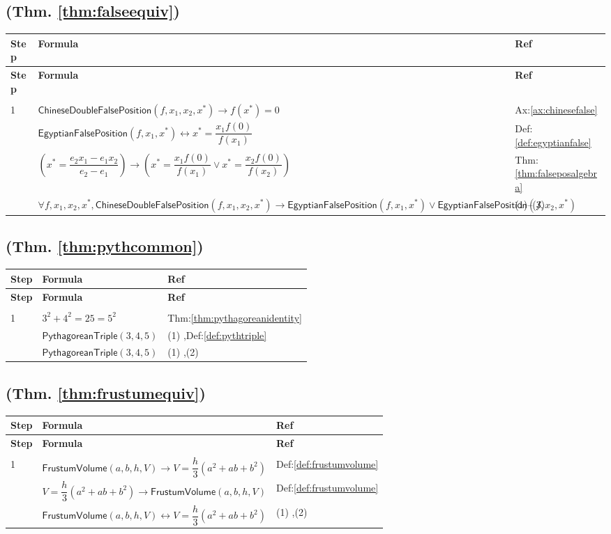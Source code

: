 \documentclass[12pt]{amsart}
\newcommand{\br}{,\allowbreak}
\newenvironment{prooftable}{%
	\renewcommand{\arraystretch}{1.2}%
	\setlength{\tabcolsep}{4pt}%
	\setlength{\arrayrulewidth}{0.05pt}
	\tiny
	\sloppy
	\begin{longtable}{
			|>{\centering\arraybackslash}m{0.7cm}|
			>{\raggedright\centering\arraybackslash}m{0.70\textwidth}|
			>{\centering\arraybackslash}m{3.5cm}|  %
		}%
		\hline
		\textbf{Step} & \centering\textbf{Formula} & \textbf{Ref} \\
		\hline
		\endfirsthead
		\hline
		\textbf{Step} & \centering\textbf{Formula} & \textbf{Ref} \\
		\hline
		\endhead
		\hline
		\multicolumn{3}{r}{\textit{Continued on next page}} \\
		\endfoot
		\hline
		\endlastfoot
	}{%
	\end{longtable}%
}
\begin{document}
\subsection{(Thm. \ref{thm:falseequiv})}
\begin{prooftable}
	1 & $\textsf{ChineseDoubleFalsePosition}(f \br x_1 \br x_2 \br x^*) \to f(x^*)=0$ & Ax:\ref{ax:chinesefalse} \\[3pt] \hline
	2 & $\textsf{EgyptianFalsePosition}(f \br x_1 \br x^*) \leftrightarrow x^* = \dfrac{x_1 f(0)}{f(x_1)}$ & Def:\ref{def:egyptianfalse} \\[3pt] \hline
	3 & $\left( x^* = \dfrac{e_2 x_1 - e_1 x_2}{e_2 - e_1} \right) \to \left( x^* = \dfrac{x_1 f(0)}{f(x_1)} \vee x^* = \dfrac{x_2 f(0)}{f(x_2)} \right)$ & Thm:\ref{thm:falseposalgebra} \\[3pt] \hdashline
	& $\forall f \br x_1 \br x_2 \br x^* \br  \textsf{ChineseDoubleFalsePosition}(f \br x_1 \br x_2 \br x^*) \to \textsf{EgyptianFalsePosition}(f \br x_1 \br x^*) \vee \textsf{EgyptianFalsePosition}(f \br x_2 \br x^*)$ & (1)--(3)
\end{prooftable}
\subsection{(Thm. \ref{thm:pythcommon})}
\begin{prooftable}
	1 & $3^2+4^2 = 25 = 5^2$ & Thm:\ref{thm:pythagoreanidentity} \\[3pt] \hline
	2 & $\textsf{PythagoreanTriple}(3 \br 4 \br 5)$ & (1) \br  Def:\ref{def:pythtriple} \\[3pt] \hdashline
	& $\textsf{PythagoreanTriple}(3 \br 4 \br 5)$ & (1) \br (2)
\end{prooftable}

\subsection{(Thm. \ref{thm:frustumequiv})}
\begin{prooftable}
	1 & $\textsf{FrustumVolume}(a \br b \br h \br V) \to V = \dfrac{h}{3}(a^2+ab+b^2)$ & Def:\ref{def:frustumvolume} \\[3pt] \hline
	2 & $V = \dfrac{h}{3}(a^2+ab+b^2) \to \textsf{FrustumVolume}(a \br b \br h \br V)$ & Def:\ref{def:frustumvolume} \\[3pt] \hdashline
	& $\textsf{FrustumVolume}(a \br b \br h \br V) \leftrightarrow V = \dfrac{h}{3}(a^2+ab+b^2)$ & (1) \br (2)
\end{prooftable}
\end{document}
